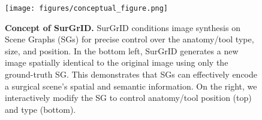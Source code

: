 \begin{figure}[H]
    \centering
    \texttt{[image: figures/conceptual\_figure.png]}
    \caption{\textbf{Concept of SurGrID.} SurGrID conditions image synthesis on Scene Graphs (SGs) for precise control over the anatomy/tool type, size, and position. In the bottom left, SurGrID generates a new image spatially identical to the original image using only the ground-truth SG. This demonstrates that SGs can effectively encode a surgical scene's spatial and semantic information. On the right, we interactively modify the SG to control anatomy/tool position (top) and type (bottom).
    }
    \label{fig:intro}
\end{figure}